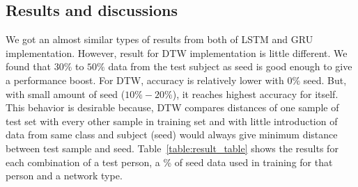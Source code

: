 \documentclass[10pt,twocolumn,letterpaper]{article}
\begin{document}
\subsection{Results and discussions}
We got an almost similar types of results from both of LSTM and GRU implementation. However, result for DTW implementation is little different. We found that $30\%$ to $50\%$ data from the test subject as seed is good enough to give a performance boost. For DTW, accuracy is relatively lower with $0\%$ seed. But, with small amount of seed ($10\%-20\%$), it reaches highest accuracy for itself. This behavior is desirable because, DTW compares distances of one sample of test set with every other sample in training set and with little introduction of data from same class and subject (seed) would always give minimum distance between test sample and seed. Table~\ref{table:result_table} shows the results for each combination of a test person, a \% of seed data used in training for that person and a network type.
\end{document}
